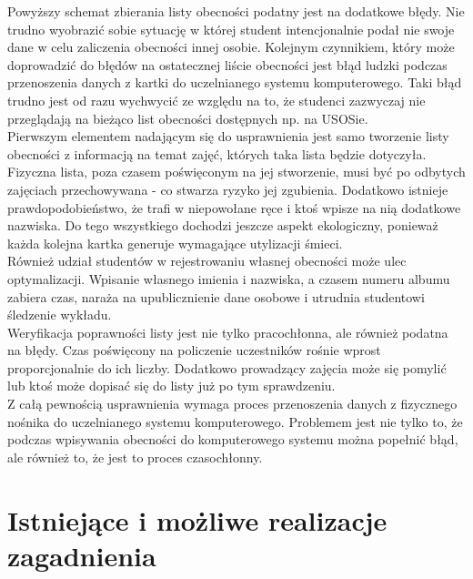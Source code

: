 \documentclass[declaration,shortabstract, mgr]{iithesis}
\begin{document}
\indent Powyższy schemat zbierania listy obecności podatny jest na dodatkowe błędy. Nie trudno wyobrazić sobie sytuację w której student intencjonalnie podał nie swoje dane w celu zaliczenia obecności innej osobie. Kolejnym czynnikiem, który może doprowadzić do błędów na ostatecznej liście obecności jest błąd ludzki podczas przenoszenia danych z kartki do uczelnianego systemu komputerowego. Taki błąd trudno jest od razu wychwycić ze względu na to, że studenci zazwyczaj nie przeglądają na bieżąco list obecności dostępnych np. na USOSie.\\
\indent Pierwszym elementem nadającym się do usprawnienia jest samo tworzenie listy obecności z informacją na temat zajęć, których taka lista będzie dotyczyła. Fizyczna lista, poza czasem poświęconym na jej stworzenie, musi być po odbytych zajęciach przechowywana - co stwarza ryzyko jej zgubienia. Dodatkowo istnieje prawdopodobieństwo, że trafi w niepowołane ręce i ktoś wpisze na nią dodatkowe nazwiska. Do tego wszystkiego dochodzi jeszcze aspekt ekologiczny, ponieważ każda kolejna kartka generuje wymagające utylizacji śmieci. \\
\indent Również udział studentów w rejestrowaniu własnej obecności może ulec optymalizacji. Wpisanie własnego imienia i nazwiska, a czasem numeru albumu zabiera czas, naraża na upublicznienie dane osobowe i utrudnia studentowi śledzenie wykładu.\\
\indent Weryfikacja poprawności listy jest nie tylko pracochłonna, ale również podatna na błędy. Czas poświęcony na policzenie uczestników rośnie wprost proporcjonalnie do ich liczby. Dodatkowo prowadzący zajęcia może się pomylić lub ktoś może dopisać się do listy już po tym sprawdzeniu.\\
\indent Z całą pewnością usprawnienia wymaga proces przenoszenia danych z fizycznego nośnika do uczelnianego systemu komputerowego. Problemem jest nie tylko to, że podczas wpisywania obecności do komputerowego systemu można popełnić błąd, ale również to, że jest to proces czasochłonny.\\

\section{Istniejące i możliwe realizacje zagadnienia}
\end{document}
